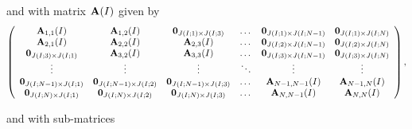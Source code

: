 \documentclass[10pt,A4paper]{article}
\begin{document}
\par\noindent and with matrix ${\bf A}(I)$ given by
\begin{equation*}
  \left(\begin{array}{cccccc}
{\bf A}_{1,1}(I) & {\bf A}_{1,2}(I) & {\bf 0}_{J(I;1)\times J(I;3)} & \dots & {\bf 0}_{J(I;1)\times J(I;N-1)} & {\bf 0}_{J(I;1)\times J(I;N)}\\
{\bf A}_{2,1}(I) & {\bf A}_{2,2}(I) & {\bf A}_{2,3}(I) & \dots & {\bf 0}_{J(I;2)\times J(I;N-1)} & {\bf 0}_{J(I;2)\times J(I;N)}\\
{\bf 0}_{J(I;3)\times J(I;1)} & {\bf A}_{3,2}(I) & {\bf A}_{3,3}(I) & \dots & {\bf 0}_{J(I;3)\times J(I;N-1)} & {\bf 0}_{J(I;3)\times J(I;N)}\\
\vdots & \vdots & \vdots & \ddots & \vdots & \vdots\\
{\bf 0}_{J(I;N-1)\times J(I;1)} & {\bf 0}_{J(I;N-1)\times J(I;2)} & {\bf 0}_{J(I;N-1)\times J(I;3)} & \dots & {\bf A}_{N-1,N-1}(I) & {\bf A}_{N-1,N}(I) \\
{\bf 0}_{J(I;N)\times J(I;1)} & {\bf 0}_{J(I;N)\times J(I;2)} & {\bf 0}_{J(I;N)\times J(I;3)} & \dots & {\bf A}_{N,N-1}(I) & {\bf A}_{N,N}(I)
                        \end{array}\right),
\end{equation*}
\par\noindent and with sub-matrices
\end{document}
